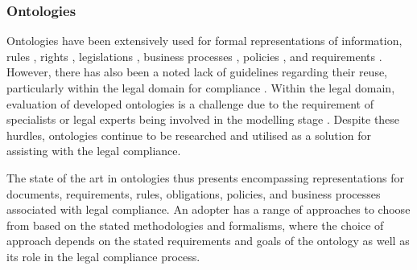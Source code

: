 \subsubsection{Ontologies}
Ontologies have been extensively used for formal representations of information, rules \cite{kirrane_scalable_2018}, rights \cite{pellegrini_genealogy_2018}, legislations \cite{leone_taking_2019}, business processes \cite{elgammal_formalizing_2016}, policies \cite{van_de_ven_qualitative_2016}, and requirements \cite{gharib_ontologies_2016}.
However, there has also been a noted lack of guidelines regarding their reuse, particularly within the legal domain for compliance \cite{casanovas_legal_2017}.
Within the legal domain, evaluation of developed ontologies is a challenge due to the requirement of specialists or legal experts being involved in the modelling stage \cite{rodrigues_legal_2019}.
Despite these hurdles, ontologies continue to be researched and utilised as a solution for assisting with the legal compliance.

The state of the art in ontologies thus presents encompassing representations for documents, requirements, rules, obligations, policies, and business processes associated with legal compliance. An adopter has a range of approaches to choose from based on the stated methodologies and formalisms, where the choice of approach depends on the stated requirements and goals of the ontology as well as its role in the legal compliance process.
